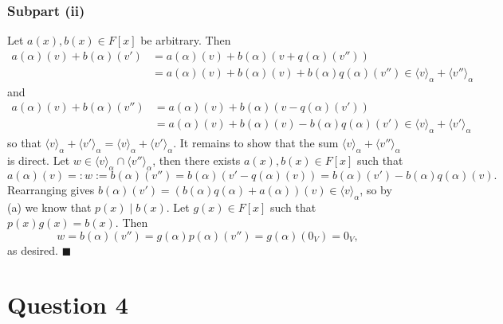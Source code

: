 \documentclass[12pt]{article}
\begin{document}
\subsubsection*{Subpart (ii)}
Let $a(x),b(x)\in F[x]$ be arbitrary. Then
\begin{align*}
    a(\alpha)(v)+b(\alpha)(v')
    &=a(\alpha)(v)+b(\alpha)(v+q(\alpha)(v''))
  \\&=a(\alpha)(v)+b(\alpha)(v)+b(\alpha)q(\alpha)(v'')
    \in \langle v \rangle_\alpha + \langle v'' \rangle_\alpha
\end{align*}
and
\begin{align*}
    a(\alpha)(v)+b(\alpha)(v'')
    &=a(\alpha)(v)+b(\alpha)(v-q(\alpha)(v'))
  \\&=a(\alpha)(v)+b(\alpha)(v)-b(\alpha)q(\alpha)(v')
    \in \langle v \rangle_\alpha + \langle v' \rangle_\alpha
\end{align*}
so that 
    $\langle v \rangle_\alpha + \langle v' \rangle_\alpha
    = \langle v \rangle_\alpha + \langle v' \rangle_\alpha$.
It remains to show that the sum
$\langle v \rangle_\alpha + \langle v'' \rangle_\alpha$ is direct.
Let $w\in\langle v \rangle_\alpha \cap \langle v'' \rangle_\alpha$, then there
exists $a(x),b(x)\in F[x]$ such that 
\[
    a(\alpha)(v)=:w:=b(\alpha)(v'')
    =b(\alpha)(v'-q(\alpha)(v))=b(\alpha)(v')-b(\alpha)q(\alpha)(v).
\]
Rearranging gives $b(\alpha)(v')=(b(\alpha)q(\alpha)+a(\alpha))(v)
\in\langle v \rangle_\alpha$, so by (a) we know that $p(x)  \mid  b(x)$.
Let $g(x)\in F[x]$ such that $p(x)g(x)=b(x)$. Then
\[
    w = b(\alpha)(v'') = g(\alpha)p(\alpha)(v'')=g(\alpha)(0_V)=0_V,
\]
as desired.
\hfill$\blacksquare$

\newpage
\section*{Question 4}
\end{document}
